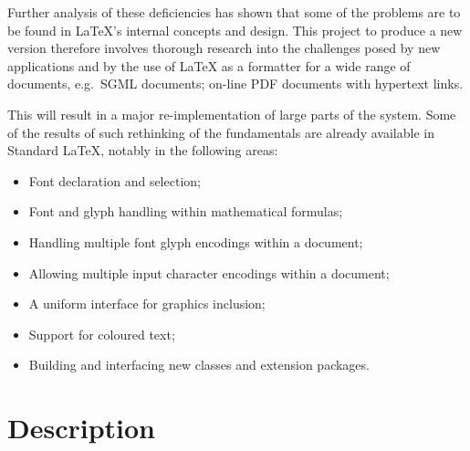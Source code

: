 \documentclass[a4paper]{article}
\newcommand{\eg}{e.g.~}
\newcommand{\SGML}{{\sc SGML}}
\newcommand{\PDF}{{\sc PDF}}
\begin{document}
 Further analysis of these deficiencies has shown that some of the
 problems are to be found in \LaTeX{}'s internal concepts and design.
 This project to produce a new version therefore involves thorough
 research into the challenges posed by new applications and by the use
 of \LaTeX{} as a formatter for a wide range of documents, \eg \SGML{}
 documents; on-line \PDF{} documents with hypertext links.

 This will result in a major re-implementation of large parts of the
 system.  Some of the results of such rethinking of the fundamentals
 are already available in Standard \LaTeX{}, notably in the following
 areas:

\begin{itemize}
\item Font declaration and selection;
\item Font and glyph handling within mathematical formulas;
\item Handling multiple font glyph encodings within a document;
\item Allowing multiple input character encodings within a document; 
\item A uniform interface for graphics inclusion;
\item Support for coloured text;
\item Building and interfacing new classes and extension packages.
\end{itemize}


\section{Description}
\end{document}
